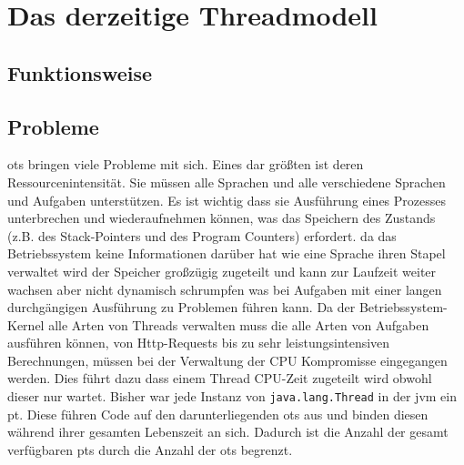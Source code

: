 \chapter{Das derzeitige Threadmodell}
\label{cha:DasDerzeitigeThreadmodell}                       %

\section{Funktionsweise}                                         
\label{sec:Funktionsweise}

\section{Probleme}                                         
\label{sec:Probleme}

\Glspl{ot} bringen viele Probleme mit sich. Eines dar größten ist deren Ressourcenintensität.
Sie müssen alle Sprachen und alle verschiedene Sprachen und Aufgaben unterstützen. Es ist wichtig dass sie Ausführung eines Prozesses unterbrechen und
wiederaufnehmen können, 
was das Speichern des Zustands (z.B. des Stack-Pointers und des Program Counters) erfordert. da das Betriebssystem keine Informationen darüber hat wie
eine Sprache ihren Stapel verwaltet wird der Speicher großzügig zugeteilt und kann zur Laufzeit weiter wachsen aber nicht dynamisch schrumpfen
was bei Aufgaben mit einer langen durchgängigen Ausführung zu Problemen führen kann. Da der Betriebssystem-Kernel alle Arten von Threads verwalten muss
die alle Arten von Aufgaben ausführen können, von Http-Requests bis zu sehr leistungsintensiven Berechnungen, müssen bei der
Verwaltung der CPU Kompromisse eingegangen werden. Dies führt dazu dass einem Thread CPU-Zeit zugeteilt wird obwohl dieser nur wartet.\cite{ProjectLoom}
Bisher war jede Instanz von \texttt{java.lang.Thread} in der \gls{jvm} ein \gls{pt}. Diese führen Code auf den darunterliegenden \Glspl{ot} aus und binden diesen
während ihrer gesamten Lebenszeit an sich. Dadurch ist die Anzahl der gesamt verfügbaren \Glspl{pt} durch die Anzahl der \Glspl{ot} begrenzt. \cite{JEP425}
